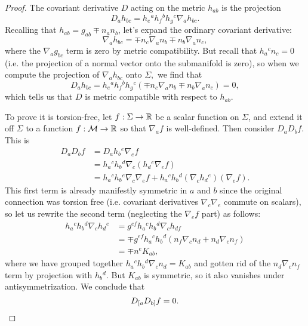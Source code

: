\begin{proof}
    The covariant derivative $D$ acting on the metric $h_{ab}$ is the projection
    \begin{equation}
        D_a h_{bc}=h_e{}^a h_f{}^b h_g{}^c \nabla_a h_{bc}.
    \end{equation}
    Recalling that $h_{ab}=g_{ab}\mp n_a n_b$, let's expand the ordinary covariant derivative:
    \begin{equation}
        \nabla_a h_{bc}=\mp n_c \nabla_a n_b \mp n_b \nabla_a n_c,
    \end{equation}
    where the $\nabla_a g_{bc}$ term is zero by metric compatibility.
    But recall that $h_a{}^c n_c =0$ (i.e. the projection of a normal vector onto the submanifold is zero), so when we compute the projection of $\nabla_a h_{bc}$ onto $\Sigma,$ we find that
    \begin{equation}
        D_a h_{bc}=h_e{}^a h_f{}^b h_g{}^c(\mp n_c \nabla_a n_b \mp n_b \nabla_a n_c)=0,
    \end{equation}
    which tells us that $D$ is metric compatible with respect to $h_{ab}$.
    
    To prove it is torsion-free, let $f:\Sigma \to \mathbb{R}$ be a scalar function on $\Sigma$, and extend it off $\Sigma$ to a function $f:\mathcal{M} \to \mathbb{R}$ so that $\nabla_a f$ is well-defined. Then consider $D_a D_b f$. This is
    \begin{align*}
        D_a D_b f &= D_a h_b{}^e \nabla_e f\\
        &= h_a{}^c h_b{}^d \nabla_c(h_d{}^e \nabla_e f)\\
        &= h_a{}^c h_b{}^e \nabla_c \nabla_e f + h_a{}^c h_b{}^d (\nabla_c h_d{}^e) (\nabla_e f).
    \end{align*}
    This first term is already manifestly symmetric in $a$ and $b$ since the original connection was torsion free (i.e. covariant derivatives $\nabla_c\nabla_e$ commute on scalars), so let us rewrite the second term (neglecting the $\nabla_e f$ part) as follows:
    \begin{align*}
        h_a{}^c h_b{}^d \nabla_c h_d{}^e 
            &= g^{ef} h_a{}^c h_b{}^d \nabla_c h_{df}\\
            &= \mp g^{ef}h_a{}^c h_b{}^d (n_f \nabla_c n_d+ n_d \nabla_c n_f)\\
            &= \mp n^e K_{ab},
    \end{align*}
    where we have grouped together $h_a{}^c h_b{}^d \nabla_c n_d =K_{ab}$ and gotten rid of the $n_d \nabla_c n_f$ term by projection with $h_b{}^d$. But $K_{ab}$ is symmetric, so it also vanishes under antisymmetrization. We conclude that
    \begin{equation}
        D_{[a}D_{b]} f=0.\qedhere
    \end{equation}
\end{proof}

